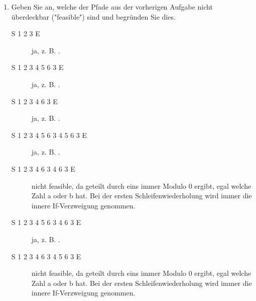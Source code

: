 \documentclass{lehramt-informatik-aufgabe}
\begin{document}
\begin{enumerate}
%

\item Geben Sie an, welche der Pfade aus der vorherigen Aufgabe nicht
überdeckbar ("feasible") sind und begründen Sie dies.

\begin{antwort}

\begin{description}
\item[S 1 2 3 E]
ja, z. B. .
\end{description}


\begin{description}
\item[S 1 2 3 4 5 6 3 E]
ja, z. B. .

\item[S 1 2 3 4 6 3 E]
ja, z. B. .
\end{description}


\begin{description}
\item[S 1 2 3 4 5 6 3 4 5 6 3 E]
ja, z. B. .

\item[S 1 2 3 4 6 3 4 6 3 E]
nicht feasible, da geteilt durch eins immer Modulo 0 ergibt, egal welche
Zahl a oder b hat. Bei der ersten Schleifenwiederholung wird immer die
innere If-Verzweigung genommen.

\item[S 1 2 3 4 5 6 3 4 6 3 E]
ja, z. B. .

\item[S 1 2 3 4 6 3 4 5 6 3 E]
nicht feasible, da geteilt durch eins immer Modulo 0 ergibt, egal welche
Zahl a oder b hat. Bei der ersten Schleifenwiederholung wird immer die
innere If-Verzweigung genommen.
\end{description}
\end{antwort}

\end{enumerate}
\end{document}

